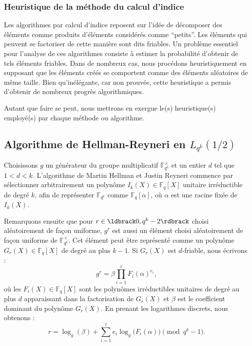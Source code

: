 \documentclass[a4paper, titlepage, 11pt]{article}
\theoremstyle{definition}
\theoremstyle{remark}
\def\gf #1{\mathbb{F}_{#1}}
\begin{document}
\subsubsection{Heuristique de la méthode du calcul d'indice}

Les algorithmes par calcul d'indice reposent sur l'idée de décomposer des éléments comme produits d'éléments considérés comme ``petits''. Les éléments qui peuvent se factoriser de cette manière sont dits friables. Un problème essentiel pour l'analyse de ces algorithmes consiste à estimer la probabilité d'obtenir de tels éléments friables. Dans de nombreux cas, nous procédons heuristiquement en supposant que les éléments créés se comportent comme des éléments aléatoires de même taille. Bien qu'inélégante, car non prouvée, cette heuristique a permis d'obtenir de nombreux progrès algorithmiques.

Autant que faire se peut, nous mettrons en exergue le(s) heuristique(s) employé(s) par chaque méthode ou algorithme.

\subsection{Algorithme de Hellman-Reyneri en $L_{q^k}(1/2)$}

Choisissons $g$ un générateur du groupe multiplicatif $\gf{q^k}^\times$ et un entier $d$ tel que $1 < d < k$. L'algorithme de Martin Hellman et Justin Reyneri \cite{hellman1982} commence par sélectionner arbitrairement un polynôme $I_k(X) \in \gf{q}[X]$ unitaire irréductible de degré $k$, afin de représenter $\gf{q^k}$ comme $\gf{q}[\alpha]$, où $\alpha$ est une racine fixée de $I_k(X)$.

Remarquons ensuite que pour $r \in \ldbrack 0, q^k - 2 \rdbrack$ choisi aléatoirement de façon uniforme, $g^r$ est aussi un élément choisi aléatoirement de façon uniforme de $\gf{q^k}^\times$. Cet élément peut être représenté comme un polynôme $G_r(X) \in \gf{q}[X]$ de degré au plus $k-1$. Si $G_r(X)$ est $d$-friable, nous écrivons :
$$g^r = \beta \prod_{i=1}^{t} F_i(\alpha)^{e_i},$$
où les $F_i(X)\in \gf{q}[X]$ sont les polynômes irréductibles unitaires de degré au plus $d$ apparaissant dans la factorisation de $G_r(X)$ et $\beta$ est le coefficient dominant du polynôme $G_r(X)$. En prenant les logarithmes discrets, nous obtenons :
\begin{equation}\label{eqn:hellman-reyneri}
r = \log_g(\beta) + \sum_{i=1}^t e_i\log_g\big(F_i(\alpha)\big) \pmod{q^k - 1}.
\end{equation}
\end{document}
